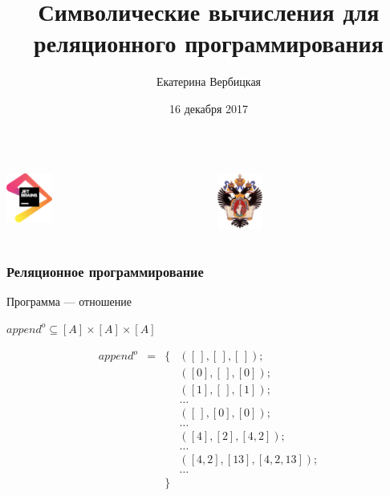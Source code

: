 \documentclass{beamer}
\title[]{Символические вычисления для реляционного программирования}
\institute[]{
Лаборатория языковых инструментов JetBrains
\\
Санкт-Петербургский государственный университет }
\author[Екатерина Вербицкая]{Екатерина Вербицкая}
\date{16 декабря 2017}
\begin{document}
{

\begin{frame}
  \begin{columns} 
    \begin{column}{4.1cm}
      \begin{center} 
        {\includegraphics[width=1.5cm]{pics/jb.png}} 
      \end{center}
    \end{column}
    \begin{column}{4.1cm}
      \begin{center} 
        {\includegraphics[width=1.5cm]{pics/SPbGU_Logo.png}} 
      \end{center}
    \end{column}
  \end{columns}

  \titlepage
\end{frame}
}

\begin{frame}[fragile]
  \transwipe[direction=90]
  \frametitle{Реляционное программирование}
  Программа --- отношение 
  
\begin{center}
$append^{o} \subseteq [A] \times [A] \times [A] $ 

$$
\begin{array}{lrcl}
append^{o} & = & \{ & ([\,], [\,], [\,]); \\
           &   &    & ([0], [\,], [0]); \\ 
           &   &    & ([1], [\,], [1]); \\
           &   &    & \dots \\
           &   &    & ([\,], [0], [0]); \\
           &   &    & \dots \\
           &   &    & ([4], [2], [4, 2]); \\
           &   &    & \dots \\
           &   &    & ([4, 2], [13], [4, 2, 13]); \\
           &   &    & \dots \\
           &   & \}
\end{array}
$$ 
\end{center}
\end{frame}
\end{document}
